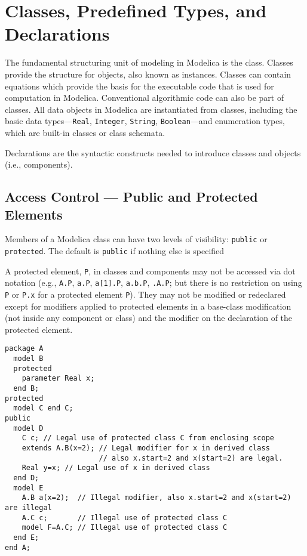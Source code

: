 \chapter{Classes, Predefined Types, and Declarations}\label{class-predefined-types-and-declarations}

The fundamental structuring unit of modeling in Modelica is the class.
Classes provide the structure for objects, also known as instances.
Classes can contain equations which provide the basis for the executable
code that is used for computation in Modelica. Conventional algorithmic
code can also be part of classes. All data objects in Modelica are
instantiated from classes, including the basic data types---\lstinline!Real!,
\lstinline!Integer!, \lstinline!String!, \lstinline!Boolean!---and enumeration types, which are built-in
classes or class schemata.

Declarations are the syntactic constructs needed to introduce classes
and objects (i.e., components).

\section{Access Control --- Public and Protected Elements}\label{access-control-public-and-protected-elements}

Members of a Modelica class can have two levels of visibility: \lstinline!public! or
\lstinline!protected!. The default is \lstinline!public! if nothing else is specified

A protected element, \lstinline!P!, in classes and components may not be accessed via dot notation (e.g., \lstinline!A.P!, \lstinline!a.P!, \lstinline!a[1].P!, \lstinline!a.b.P!,
\lstinline!.A.P!; but there is no restriction on using \lstinline!P! or \lstinline!P.x! for a protected element \lstinline!P!).  They may not be modified or redeclared except for
modifiers applied to protected elements in a base-class modification (not inside any component or class) and the modifier on the declaration of the protected element.

\begin{example}
\begin{lstlisting}[language=modelica]
package A
  model B
  protected
    parameter Real x;
  end B;
protected
  model C end C;
public
  model D
    C c; // Legal use of protected class C from enclosing scope
    extends A.B(x=2); // Legal modifier for x in derived class
                      // also x.start=2 and x(start=2) are legal.
    Real y=x; // Legal use of x in derived class
  end D;
  model E
    A.B a(x=2);  // Illegal modifier, also x.start=2 and x(start=2) are illegal
    A.C c;       // Illegal use of protected class C
    model F=A.C; // Illegal use of protected class C
  end E;
end A;
\end{lstlisting}
\end{example}

